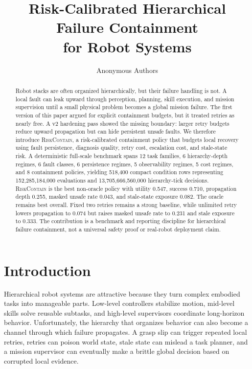 \documentclass{article}
\title{Risk-Calibrated Hierarchical\\Failure Containment\\for Robot Systems}
\author{Anonymous Authors}
\newcommand{\method}{\textsc{RiskContain}\xspace}
\begin{document}
\maketitle
\nocite{*}

\begin{abstract}
Robot stacks are often organized hierarchically, but their failure handling is not. A local fault can leak upward through perception, planning, skill execution, and mission supervision until a small physical problem becomes a global mission failure. The first version of this paper argued for explicit containment budgets, but it treated retries as nearly free. A v2 hardening pass showed the missing boundary: larger retry budgets reduce upward propagation but can hide persistent unsafe faults. We therefore introduce \method, a risk-calibrated containment policy that budgets local recovery using fault persistence, diagnosis quality, retry cost, escalation cost, and stale-state risk. A deterministic full-scale benchmark spans 12 task families, 6 hierarchy-depth regimes, 6 fault classes, 6 persistence regimes, 5 observability regimes, 5 cost regimes, and 8 containment policies, yielding 518,400 compact condition rows representing 152,285,184,000 evaluations and 13,705,666,560,000 hierarchy-tick decisions. \method is the best non-oracle policy with utility 0.547, success 0.710, propagation depth 0.255, masked unsafe rate 0.043, and stale-state exposure 0.082. The oracle remains best overall. Fixed two retries remains a strong baseline, while unlimited retry lowers propagation to 0.074 but raises masked unsafe rate to 0.231 and stale exposure to 0.333. The contribution is a benchmark and reporting discipline for hierarchical failure containment, not a universal safety proof or real-robot deployment claim.
\end{abstract}

\section{Introduction}

Hierarchical robot systems are attractive because they turn complex embodied tasks into manageable parts. Low-level controllers stabilize motion, mid-level skills solve reusable subtasks, and high-level supervisors coordinate long-horizon behavior. Unfortunately, the hierarchy that organizes behavior can also become a channel through which failure propagates. A grasp slip can trigger repeated local retries, retries can poison world state, stale state can mislead a task planner, and a mission supervisor can eventually make a brittle global decision based on corrupted local evidence.
\end{document}

